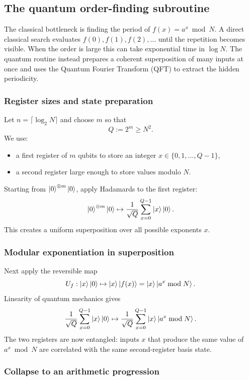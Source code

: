 \subsection{The quantum order-finding subroutine}

The classical bottleneck is finding the period of $f(x)=a^x \bmod N$. A direct classical search evaluates $f(0),f(1),f(2),\dots$ until the repetition becomes visible. When the order is large this can take exponential time in $\log N$. The quantum routine instead prepares a coherent superposition of many inputs at once and uses the Quantum Fourier Transform (QFT) to extract the hidden periodicity.

\subsubsection{Register sizes and state preparation}

Let $n = \lceil \log_2 N \rceil$ and choose $m$ so that
\[
    Q := 2^m \geq N^2.
\]
We use:
\begin{itemize}
    \item a first register of $m$ qubits to store an integer $x \in \{0,1,\dots,Q-1\}$,
    \item a second register large enough to store values modulo $N$.
\end{itemize}

Starting from $\ket{0}^{\otimes m}\ket{0}$, apply Hadamards to the first register:
\[
    \ket{0}^{\otimes m}\ket{0}
    \mapsto
    \frac{1}{\sqrt{Q}} \sum_{x=0}^{Q-1} \ket{x}\ket{0}.
\]
This creates a uniform superposition over all possible exponents $x$.

\subsubsection{Modular exponentiation in superposition}

Next apply the reversible map
\[
    U_f:\ket{x}\ket{0} \mapsto \ket{x}\ket{f(x)}
    =
    \ket{x}\ket{a^x \bmod N}.
\]
Linearity of quantum mechanics gives
\[
    \frac{1}{\sqrt{Q}} \sum_{x=0}^{Q-1} \ket{x}\ket{0}
    \mapsto
    \frac{1}{\sqrt{Q}} \sum_{x=0}^{Q-1} \ket{x}\ket{a^x \bmod N}.
\]
The two registers are now entangled: inputs $x$ that produce the same value of $a^x \bmod N$ are correlated with the same second-register basis state.

\subsubsection{Collapse to an arithmetic progression}

